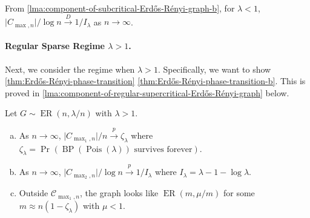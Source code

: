 \begin{note}
	From \autoref{lma:component-of-subcritical-Erdős-Rényi-graph-b}, for \(\lambda < 1\), \(\lvert C_{\max , n} \rvert / \log n \overset{D}{\to} 1 / I_\lambda \) as \(n \to \infty \).
\end{note}

\paragraph{Regular Sparse Regime \(\lambda > 1\).}
Next, we consider the regime when \(\lambda > 1\). Specifically, we want to show \autoref{thm:Erdős-Rényi-phase-transition} \autoref{thm:Erdős-Rényi-phase-transition-b}. This is proved in \autoref{lma:component-of-regular-supercritical-Erdős-Rényi-graph} below.

\begin{lemma}\label{lma:component-of-regular-supercritical-Erdős-Rényi-graph}
	Let \(G \sim \operatorname{ER}(n, \lambda / n) \) with \(\lambda > 1\).
	\begin{enumerate}[(a)]
		\item\label{lma:component-of-regular-supercritical-Erdős-Rényi-graph-a} As \(n\to \infty \), \(\lvert C_{\max _1, n} \rvert / n \overset{p}{\to} \zeta _\lambda\) where \(\zeta _\lambda = \Pr_{}(\operatorname{BP}(\operatorname{Pois}(\lambda ) ) \text{ survives forever} ) \).
		\item\label{lma:component-of-regular-supercritical-Erdős-Rényi-graph-b} As \(n\to \infty \), \(\lvert C_{\max _2, n} \rvert / \log n \overset{p}{\to} 1 / I_\lambda \) where \(I_\lambda = \lambda - 1 - \log \lambda \).
		\item\label{lma:component-of-regular-supercritical-Erdős-Rényi-graph-c} Outside \(\mathcal{C} _{\max _1, n}\), the graph looks like \(\operatorname{ER}(m, \mu / m) \) for some \(m \approx n (1 - \zeta _\lambda )\) with \(\mu < 1\).
	\end{enumerate}
\end{lemma}

